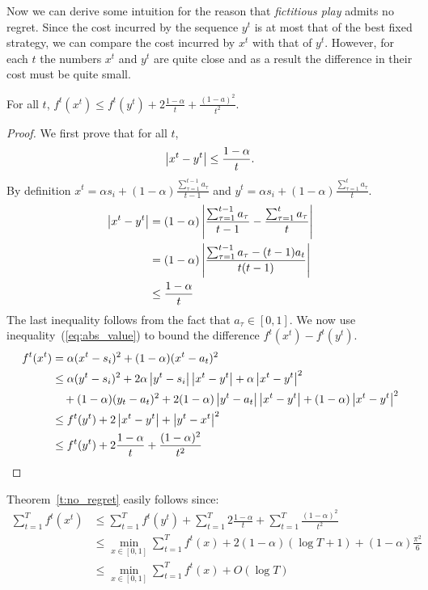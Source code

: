 Now we can derive some intuition for the reason that \emph{fictitious play}
admits no regret. Since the cost incurred by the sequence $y^t$ is at most that
of the best fixed strategy, we can compare the cost incurred by $x^t$ with
that of $y^t$.  However, for each $t$ the numbers $x^t$ and $y^t$ are quite
close and as a result the difference in their cost must be quite small.

\begin{lemma}
  For all $t$,
  \(f^t(x^t) \leq f^t(y^t) + 2\frac{1-\alpha}{t} + \frac{(1-a)^2}{t^2}\).
\end{lemma}
\begin{proof}
  We first prove that for all $t$,
  \begin{equation}\label{eq:abs_value}
    \left|x^t - y^t \right| \leq \frac{1-\alpha}{t}.
  \end{equation}
  By definition
  \(x^t = \alpha s_i + (1-\alpha)\frac{\sum_{\tau = 1}^{t-1} a_\tau}{t-1}\)
  and
  \( y^t = \alpha s_i + (1-\alpha)\frac{\sum_{\tau = 1}^t a_\tau}{t}\).
  \begin{align*}
    \left|x^t - y^t\right|
    &=
    (1-\alpha)\left|\frac{\sum_{\tau = 1}^{t-1}a_\tau}{t-1}
    - \frac{\sum_{\tau = 1}^t a_\tau}{t}\right|\\
    &=
    (1-\alpha)\left|\frac{\sum_{\tau = 1}^{t-1}a_\tau -(t-1)a_t}{t(t-1)}\right|\\
    &\leq
    \frac{1-\alpha}{t}
  \end{align*}
  The last inequality follows from the fact that $a_\tau \in [0,1]$.
  We now use inequality~(\ref{eq:abs_value}) to bound the difference
  \( f^t(x^t) - f^t(y^t) \).
  \begin{align*}
    f^t(x^t)
    &=
    \alpha(x^t - s_i)^2 + (1 - \alpha)(x^t - a_t)^2 \\
    &\leq
    \alpha(y^t - s_i)^2 + 2\alpha\left|y^t -
    s_i\right|\left|x^t - y^t\right| + \alpha \left|x^t - y^t\right|^2 \\
    &\quad + (1-\alpha)(y_t - a_t)^2 +
    2(1-\alpha)\left|y^t - a_t\right|\left|x^t-y^t\right| + (1 - \alpha)\left|x^t - y^t\right|^2\\
    &\leq
    f^t(y^t) + 2\left|x^t - y^t\right| + \left|y^t - x^t\right|^2\\
    &\leq
    f^t(y^t) + 2\frac{1-\alpha}{t} + \frac{(1-\alpha)^2}{t^2}
  \end{align*}
\end{proof}

Theorem~\ref{t:no_regret} easily follows since:
\begin{align*}
  \sum_{t=1}^T f^t(x^t)
  &\leq
  \sum_{t=1}^T f^t(y^t) + \sum_{t=1}^T 2\frac{1-\alpha}{t} +
  \sum_{t=1}^T \frac{(1-\alpha)^2}{t^2}\\
  &\leq
  \min_{x \in [0,1]} \sum_{t=1}^T f^t(x) +
  2(1-\alpha)(\log T + 1) + (1-\alpha)\frac{\pi^2}{6}\\
  &\leq
  \min_{x \in [0,1]} \sum_{t=1}^T f^t(x) + O(\log T)
\end{align*}

